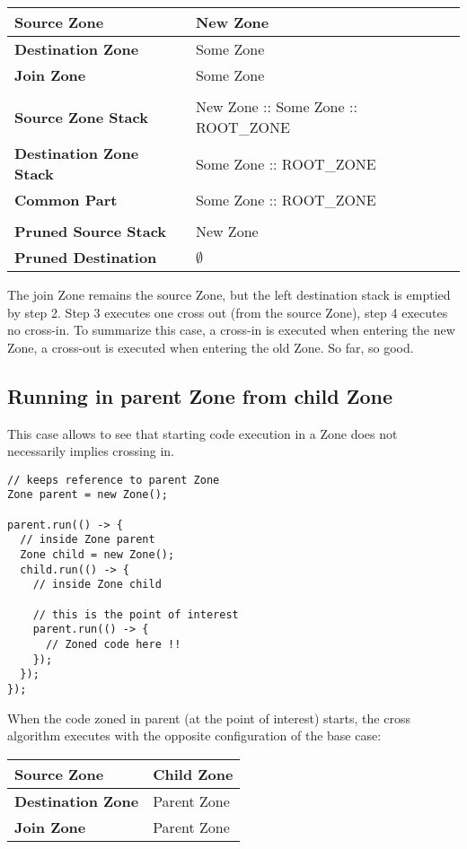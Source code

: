 \begin{tabular}{| l | l |}
\hline
\textbf{Source Zone} & New Zone
\\ \hline
\textbf{Destination Zone} & Some Zone
\\ \hline
\textbf{Join Zone} & Some Zone
\\ \hline
\multicolumn{2}{l}{}
\\ \hline
\textbf{Source Zone Stack} &  New Zone :: Some Zone :: ROOT\_ZONE
\\ \hline
\textbf{Destination Zone Stack} & Some Zone :: ROOT\_ZONE
\\ \hline
\textbf{Common Part} & Some Zone :: ROOT\_ZONE
\\ \hline
\multicolumn{2}{l}{}
\\ \hline
\textbf{Pruned Source Stack} & New Zone
\\ \hline
\textbf{Pruned Destination} & $\emptyset$
\\ \hline
\end{tabular}

The join Zone remains the source Zone, but the left destination stack is emptied by step 2. Step 3 executes one cross out (from the source Zone), step 4 executes no cross-in. To summarize this case, a cross-in is executed when entering the new Zone, a cross-out is executed when entering the old Zone. So far, so good.

\subsection*{Running in parent Zone from child Zone}

This case allows to see that starting code execution in a Zone does not necessarily implies crossing in.

\begin{lstlisting}
// keeps reference to parent Zone
Zone parent = new Zone();

parent.run(() -> {
  // inside Zone parent
  Zone child = new Zone();
  child.run(() -> {
    // inside Zone child

    // this is the point of interest
    parent.run(() -> {
      // Zoned code here !!
    });
  });
});
\end{lstlisting}

When the code zoned in parent (at the point of interest) starts, the cross algorithm executes with the opposite configuration of the base case:

\begin{tabular}{| l | l |}
\hline
\textbf{Source Zone} & Child Zone
\\ \hline
\textbf{Destination Zone} & Parent Zone
\\ \hline
\textbf{Join Zone} & Parent Zone
\\ \hline
\end{tabular}

